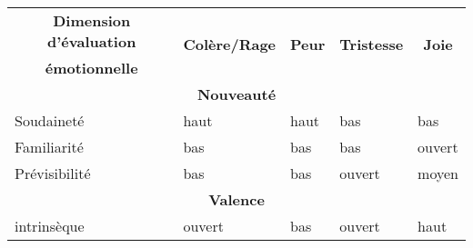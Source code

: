 \begin{table}[tbp]
\begin{tabular}{|l|l|l|l|l|}
\hline
\multicolumn{1}{|c|}{\textbf{Dimension d’évaluation}} & \multicolumn{1}{c|}{\multirow{2}{*}{\textbf{Colère/Rage}}} & \multicolumn{1}{c|}{\multirow{2}{*}{\textbf{Peur}}} & \multicolumn{1}{c|}{\multirow{2}{*}{\textbf{Tristesse}}} & \multicolumn{1}{c|}{\multirow{2}{*}{\textbf{Joie}}} \\
\multicolumn{1}{|c|}{\textbf{émotionnelle}}           & \multicolumn{1}{c|}{}                                      & \multicolumn{1}{c|}{}                               & \multicolumn{1}{c|}{}                                    & \multicolumn{1}{c|}{}                               \\ \hline
\multicolumn{5}{|c|}{\textbf{Nouveauté}}                                                                                                                                                                                                                                                  \\ \hline
Soudaineté                                            & haut                                                       & haut                                                & bas                                                      & bas                                                 \\ \hline
Familiarité                                           & bas                                                        & bas                                                 & bas                                                      & ouvert                                              \\ \hline
Prévisibilité                                         & bas                                                        & bas                                                 & ouvert                                                   & moyen                                               \\ \hline
\multicolumn{5}{|c|}{\textbf{Valence}}                                                                                                                                                                                                                                                    \\ \hline
intrinsèque                                           & ouvert                                                     & bas                                                 & ouvert                                                   & haut                                                \\ \hline

\end{tabular}
\end{table}
